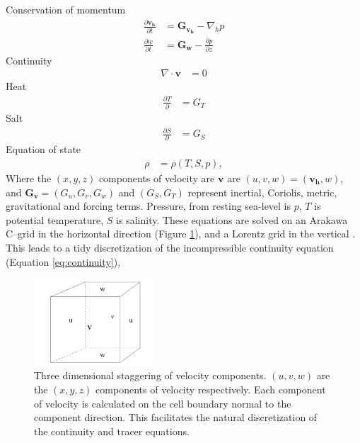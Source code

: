 Conservation of momentum
\begin{align}
    \frac{\partial \mathbf{v_h}}{\partial t}  &= \mathbf{G_{v_h}} -  \nabla_h p \label{eq:momentum}\\
    \frac{\partial w}{\partial t} &= \mathbf{G_w} - \frac{\partial p }{\partial z} \label{eq:momentum2}
\end{align}
Continuity
\begin{align}
    \nabla \cdot \mathbf{v} &= 0 \label{eq:continuity}
\end{align}
Heat
\begin{align}
    \frac{\partial T}{\partial} &= G_T
\end{align}
Salt
\begin{align}
    \frac{\partial S}{\partial} &= G_S 
\end{align}
Equation of state
\begin{align}
    \rho &= \rho(T,S, p),
\end{align}
Where the $(x,y,z)$ components of velocity are  $\mathbf{v}$ are  $(u,v,w) = (\mathbf{v_h},w) $, and $\mathbf{G_v} = (G_u,G_v,G_w)$ and $(G_S,G_T)$ represent inertial, Coriolis, metric, gravitational and forcing terms. Pressure, from resting sea-level is $p$, $T$ is potential temperature, $S$ is salinity.
These equations are solved on an Arakawa C--grid in the horizontal direction (Figure \ref{fig:c_grid}), and a Lorentz grid in the vertical \citep{adcroft1997representation}. This leads to a tidy discretization of the incompressible continuity equation (Equation \ref{eq:continuity}),

\begin{figure}[!ht]
\centering
\includegraphics[width=0.4\textwidth]{chapters/4/c_grid.png}
\caption[C--grid]{ Three dimensional staggering of velocity components. $(u, v, w)$ are the $(x,y,z)$ components of velocity respectively. Each component of velocity is calculated on the cell boundary normal to the component direction. This facilitates the natural discretization of the continuity and tracer equations.}
\label{fig:c_grid}
\end{figure}

